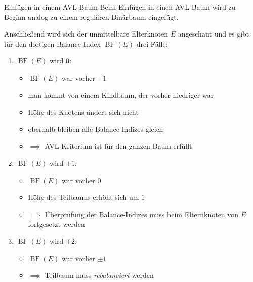\documentclass[german]{../spicker}
\newcommand{\BF}{\operatorname{BF}}
\begin{document}
\begin{algo}{Einfügen in einem AVL-Baum}
    Beim Einfügen in einen AVL-Baum wird zu Beginn analog zu einem regulären Binärbaum eingefügt.

    Anschließend wird sich der unmittelbare Elterknoten $E$ angeschaut und es gibt für den dortigen Balance-Index $\BF(E)$ drei Fälle:
    \begin{enumerate}
        \item $\BF(E)$ wird $0$:
              \begin{itemize}[-]
                  \item $\BF(E)$ war vorher $-1$
                  \item man kommt von einem Kindbaum, der vorher niedriger war
                  \item Höhe des Knotens ändert sich nicht
                  \item oberhalb bleiben alle Balance-Indizes gleich
                  \item $\implies$ AVL-Kriterium ist für den ganzen Baum erfüllt
              \end{itemize}
        \item $\BF(E)$ wird $\pm 1$:
              \begin{itemize}[-]
                  \item $\BF(E)$ war vorher $0$
                  \item Höhe des Teilbaums erhöht sich um $1$
                  \item $\implies$ Überprüfung der Balance-Indizes muss beim Elternknoten von $E$ fortgesetzt werden
              \end{itemize}
        \item $\BF(E)$ wird $\pm 2$:
              \begin{itemize}[-]
                  \item $\BF(E)$ war vorher $\pm 1$
                  \item $\implies$ Teilbaum muss \emph{rebalanciert} werden
              \end{itemize}
    \end{enumerate}
\end{algo}
\end{document}
